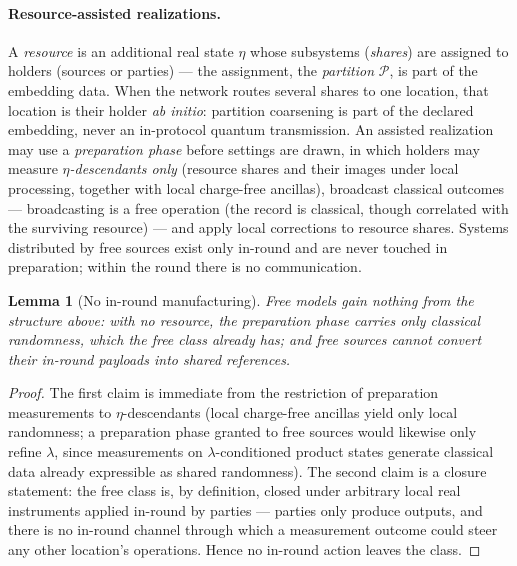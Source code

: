 \documentclass[11pt]{article}
\theoremstyle{plain}
\newtheorem{lemma}[theorem]{Lemma}
\theoremstyle{definition}
\theoremstyle{remark}
\theoremstyle{plain}
\begin{document}
\paragraph{Resource-assisted realizations.} A \emph{resource} is
an additional real state $\eta$ whose subsystems (\emph{shares})
are assigned to holders (sources or parties) --- the assignment,
the \emph{partition} $\mathcal P$, is part of the embedding data.
When the network routes several shares to one location, that
location is their holder \emph{ab initio}: partition coarsening is
part of the declared embedding, never an in-protocol quantum
transmission. An
assisted realization may use a \emph{preparation phase} before
settings are drawn, in which holders may measure
\emph{$\eta$-descendants only} (resource shares and their images
under local processing, together with local charge-free ancillas),
broadcast classical outcomes --- broadcasting is a free operation
(the record is classical, though correlated with the surviving
resource) --- and apply local corrections to resource shares. Systems distributed by free sources exist only in-round
and are never touched in preparation; within the round there is no
communication.

\begin{lemma}[No in-round manufacturing]\label{lem:noman}
Free models gain nothing from the structure above: with no
resource, the preparation phase carries only classical randomness,
which the free class already has; and free sources cannot convert
their in-round payloads into shared references.
\end{lemma}

\begin{proof}
The first claim is immediate from the restriction of preparation
measurements to $\eta$-descendants (local charge-free ancillas
yield only local randomness; a preparation phase granted to free
sources would likewise only refine $\lambda$, since measurements
on $\lambda$-conditioned product states generate classical data
already expressible as shared randomness). The second claim is a
closure statement: the free class is, by definition, closed under
arbitrary local real instruments applied in-round by parties ---
parties only produce outputs, and there is no in-round channel
through which a measurement outcome could steer any other
location's operations. Hence no in-round action leaves the class.
\end{proof}
\end{document}
